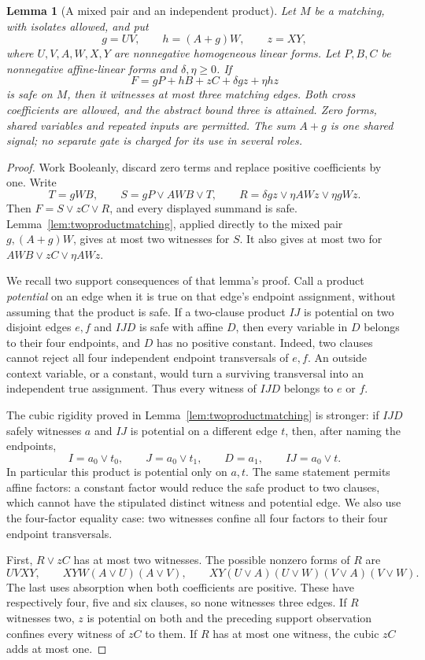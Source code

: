 \documentclass[11pt]{article}
\newtheorem{lemma}[theorem]{Lemma}
\theoremstyle{definition}
\theoremstyle{remark}
\begin{document}
\begin{lemma}[A mixed pair and an independent product]\label{lem:mixedpairfull}
Let $M$ be a matching, with isolates allowed, and put
\[
 g=UV,\qquad h=(A+g)W,\qquad z=XY,
\]
where $U,V,A,W,X,Y$ are nonnegative homogeneous linear forms. Let $P,B,C$ be nonnegative affine-linear forms and $\delta,\eta\ge0$. If
\[
 F=gP+hB+zC+\delta gz+\eta hz
\]
is safe on $M$, then it witnesses at most three matching edges. Both cross coefficients are allowed, and the abstract bound three is attained. Zero forms, shared variables and repeated inputs are permitted. The sum $A+g$ is one shared signal; no separate gate is charged for its use in several roles.
\end{lemma}
\begin{proof}
Work Booleanly, discard zero terms and replace positive coefficients by one. Write
\[
 T=gWB,\qquad S=gP\vee AWB\vee T,\qquad
 R=\delta gz\vee\eta AWz\vee\eta gWz.
\]
Then $F=S\vee zC\vee R$, and every displayed summand is safe. Lemma~\ref{lem:twoproductmatching}, applied directly to the mixed pair $g,(A+g)W$, gives at most two witnesses for $S$. It also gives at most two for $AWB\vee zC\vee\eta AWz$.

We recall two support consequences of that lemma's proof. Call a product \emph{potential} on an edge when it is true on that edge's endpoint assignment, without assuming that the product is safe. If a two-clause product $IJ$ is potential on two disjoint edges $e,f$ and $IJD$ is safe with affine $D$, then every variable in $D$ belongs to their four endpoints, and $D$ has no positive constant. Indeed, two clauses cannot reject all four independent endpoint transversals of $e,f$. An outside context variable, or a constant, would turn a surviving transversal into an independent true assignment. Thus every witness of $IJD$ belongs to $e$ or $f$.

The cubic rigidity proved in Lemma~\ref{lem:twoproductmatching} is stronger: if $IJD$ safely witnesses $a$ and $IJ$ is potential on a different edge $t$, then, after naming the endpoints,
\[
 I=a_0\vee t_0,\qquad J=a_0\vee t_1,\qquad D=a_1,
 \qquad IJ=a_0\vee t.
\]
In particular this product is potential only on $a,t$. The same statement permits affine factors: a constant factor would reduce the safe product to two clauses, which cannot have the stipulated distinct witness and potential edge. We also use the four-factor equality case: two witnesses confine all four factors to their four endpoint transversals.

First, $R\vee zC$ has at most two witnesses. The possible nonzero forms of $R$ are
\[
 UVXY,\qquad XYW(A\vee U)(A\vee V),\qquad
 XY(U\vee A)(U\vee W)(V\vee A)(V\vee W).
\]
The last uses absorption when both coefficients are positive. These have respectively four, five and six clauses, so none witnesses three edges. If $R$ witnesses two, $z$ is potential on both and the preceding support observation confines every witness of $zC$ to them. If $R$ has at most one witness, the cubic $zC$ adds at most one.


\end{proof}
\end{document}
